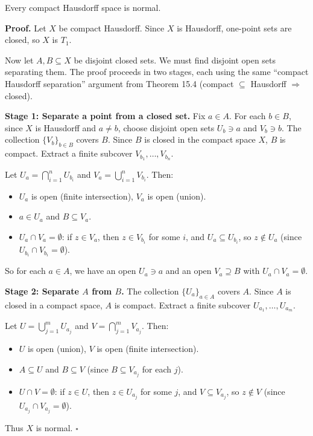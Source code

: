 \documentclass[11pt]{report}
\renewenvironment{proof}[1][Proof]{\noindent\textbf{#1.} }{\hfill$\square$\par\vspace{5pt}}
\begin{document}
\begin{thmbox}
Every compact Hausdorff space is normal.
\end{thmbox}

\begin{proof}
Let $X$ be compact Hausdorff. Since $X$ is Hausdorff, one-point sets are closed, so $X$ is $T_1$.

Now let $A, B \subseteq X$ be disjoint closed sets. We must find disjoint open sets separating them. The proof proceeds in two stages, each using the same ``compact Hausdorff separation'' argument from Theorem 15.4 (compact $\subseteq$ Hausdorff $\Rightarrow$ closed).

\textbf{Stage 1: Separate a point from a closed set.} Fix $a \in A$. For each $b \in B$, since $X$ is Hausdorff and $a \neq b$, choose disjoint open sets $U_b \ni a$ and $V_b \ni b$. The collection $\{V_b\}_{b \in B}$ covers $B$. Since $B$ is closed in the compact space $X$, $B$ is compact. Extract a finite subcover $V_{b_1}, \ldots, V_{b_n}$.

Let $U_a = \bigcap_{i=1}^{n} U_{b_i}$ and $V_a = \bigcup_{i=1}^{n} V_{b_i}$. Then:
\begin{itemize}[nosep]
    \item $U_a$ is open (finite intersection), $V_a$ is open (union).
    \item $a \in U_a$ and $B \subseteq V_a$.
    \item $U_a \cap V_a = \emptyset$: if $z \in V_a$, then $z \in V_{b_i}$ for some $i$, and $U_a \subseteq U_{b_i}$, so $z \notin U_a$ (since $U_{b_i} \cap V_{b_i} = \emptyset$).
\end{itemize}
So for each $a \in A$, we have an open $U_a \ni a$ and an open $V_a \supseteq B$ with $U_a \cap V_a = \emptyset$.

\textbf{Stage 2: Separate $A$ from $B$.} The collection $\{U_a\}_{a \in A}$ covers $A$. Since $A$ is closed in a compact space, $A$ is compact. Extract a finite subcover $U_{a_1}, \ldots, U_{a_m}$.

Let $U = \bigcup_{j=1}^{m} U_{a_j}$ and $V = \bigcap_{j=1}^{m} V_{a_j}$. Then:
\begin{itemize}[nosep]
    \item $U$ is open (union), $V$ is open (finite intersection).
    \item $A \subseteq U$ and $B \subseteq V$ (since $B \subseteq V_{a_j}$ for each $j$).
    \item $U \cap V = \emptyset$: if $z \in U$, then $z \in U_{a_j}$ for some $j$, and $V \subseteq V_{a_j}$, so $z \notin V$ (since $U_{a_j} \cap V_{a_j} = \emptyset$).
\end{itemize}
Thus $X$ is normal.
\end{proof}
\end{document}
